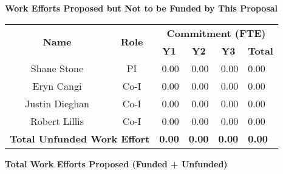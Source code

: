 \documentclass[oneside,12pt]{article}
\begin{document}
    \begin{center}
        \textbf{Work Efforts Proposed but Not to be Funded by This Proposal}
        \vspace{-1em}
    \end{center}

    \begin{table}[h]
        \centering
        \begin{tabular}{|c|c|r|r|r|l|}
            \hline
            \multirow{2}{*}{\textbf{Name}} & \multirow{2}{*}{\textbf{Role}} & \multicolumn{4}{c|}{\textbf{Commitment (FTE)}} \\
            \cline{3-6}
            & & \multicolumn{1}{c|}{\textbf{Y1}} & \multicolumn{1}{c|}{\textbf{Y2}} & \multicolumn{1}{c|}{\textbf{Y3}} & \multicolumn{1}{c|}{\textbf{Total}} \\
            \hline
            Shane Stone    & PI   & 0.00 & 0.00 & 0.00 & 0.00 \\
            Eryn Cangi     & Co-I & 0.00 & 0.00 & 0.00 & 0.00 \\
            Justin Dieghan & Co-I & 0.00 & 0.00 & 0.00 & 0.00 \\
            Robert Lillis  & Co-I & 0.00 & 0.00 & 0.00 & 0.00 \\
            \hline
            \multicolumn{2}{|l|}{\textbf{Total Unfunded Work Effort}} & \textbf{0.00} & \textbf{0.00} & \textbf{0.00} & \textbf{0.00} \\
            \hline
        \end{tabular}
    \end{table}

    \vspace{1em}

    \begin{center}
        \textbf{Total Work Efforts Proposed (Funded + Unfunded)}
        \vspace{-1em}
    \end{center}
\end{document}
